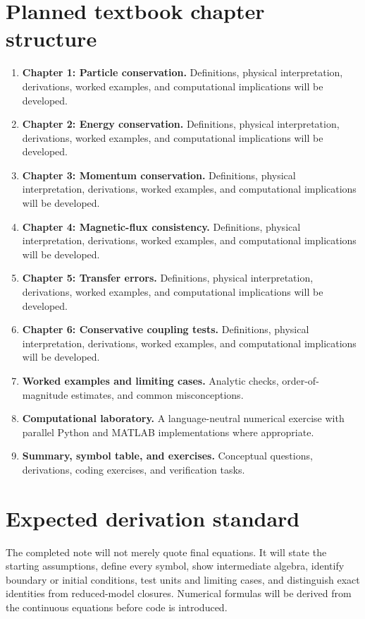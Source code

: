 \documentclass[11pt]{article}
\begin{document}
\section{Planned textbook chapter structure}
\begin{enumerate}[leftmargin=1.8em]
\item \textbf{Chapter 1: Particle conservation.} Definitions, physical interpretation, derivations, worked examples, and computational implications will be developed.
\item \textbf{Chapter 2: Energy conservation.} Definitions, physical interpretation, derivations, worked examples, and computational implications will be developed.
\item \textbf{Chapter 3: Momentum conservation.} Definitions, physical interpretation, derivations, worked examples, and computational implications will be developed.
\item \textbf{Chapter 4: Magnetic-flux consistency.} Definitions, physical interpretation, derivations, worked examples, and computational implications will be developed.
\item \textbf{Chapter 5: Transfer errors.} Definitions, physical interpretation, derivations, worked examples, and computational implications will be developed.
\item \textbf{Chapter 6: Conservative coupling tests.} Definitions, physical interpretation, derivations, worked examples, and computational implications will be developed.
\item \textbf{Worked examples and limiting cases.} Analytic checks, order-of-magnitude estimates, and common misconceptions.
\item \textbf{Computational laboratory.} A language-neutral numerical exercise with parallel Python and MATLAB implementations where appropriate.
\item \textbf{Summary, symbol table, and exercises.} Conceptual questions, derivations, coding exercises, and verification tasks.
\end{enumerate}

\section{Expected derivation standard}
The completed note will not merely quote final equations. It will state the starting assumptions, define every symbol, show intermediate algebra, identify boundary or initial conditions, test units and limiting cases, and distinguish exact identities from reduced-model closures. Numerical formulas will be derived from the continuous equations before code is introduced.
\end{document}

